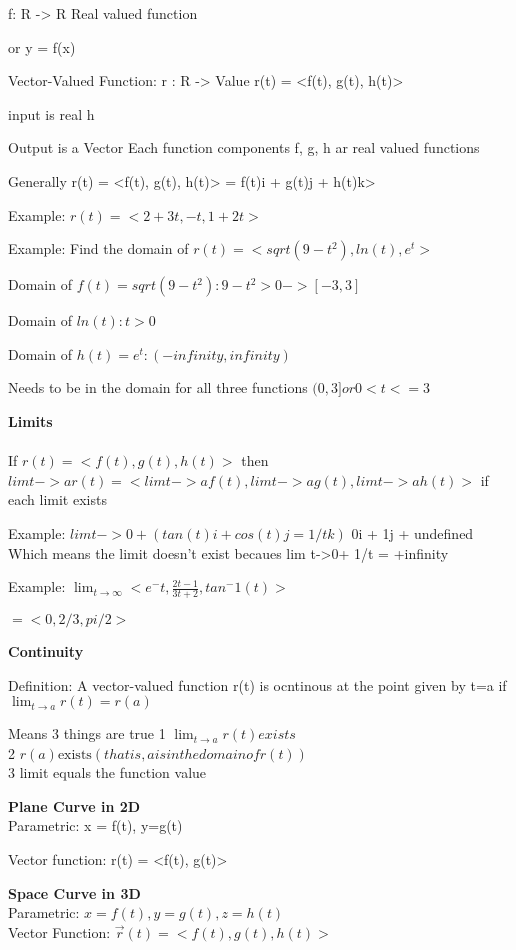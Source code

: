 \documentclass{book}
\title {}
\author{}
\date{}
\begin{document}
f: R -> R 
Real valued function

or y = f(x)

Vector-Valued Function: r : R -> Value
r(t) = <f(t), g(t), h(t)>

input is real h


Output is a Vector
Each function components f, g, h ar real valued functions



Generally r(t) = <f(t), g(t), h(t)> = f(t)i + g(t)j + h(t)k>

Example: 
$r(t) = <2+3t, -t, 1+2t>$

Example:
Find the domain of $r(t) = <sqrt(9-t^2), ln(t), e^t>$

Domain of $f(t)=sqrt(9-t^2): 9-t^2 > 0 -> [-3, 3]$

Domain of $ln(t): t > 0$

Domain of $h(t) = e^t: (-infinity, infinity)$


Needs to be in the domain for all three functions
$(0, 3] or  0  < t <= 3$


\textbf{Limits}\\
\\If $r(t) = <f(t), g(t), h(t)>$ then
$lim t->a r(t) = <lim t->a f(t), lim t->a g(t), lim t->a h(t)>$ if each limit exists

Example:
$lim t-> 0+ (tan(t)i + cos(t)j = 1/t k)$
0i + 1j + undefined 
Which means the limit doesn't exist becaues lim t->0+ 1/t = +infinity



Example:
$\lim_{t \to \infty} < e^-t, \frac{2t-1}{3t+2}, tan^-1(t) >$

$= <0, 2/3, pi/2>$

\textbf{Continuity}

Definition: A vector-valued function r(t) is ocntinous at the point given by t=a if 
$\lim_{t \to a} r(t) = r(a)$



Means 3 things are true
1 $\lim_{t \to a} r(t) exists$\\
2 $r(a) \text{exists} (that is, a is in the domain of r(t))$\\
3 limit equals the function value

\textbf{Plane Curve in 2D}\\
Parametric: x = f(t), y=g(t)

Vector function: r(t) = <f(t), g(t)>

\textbf{Space Curve in 3D}\\
Parametric: $x=f(t), y=g(t), z=h(t)$\\
Vector Function: $\vec{r}(t) = <f(t), g(t), h(t)>$
\end{document}
